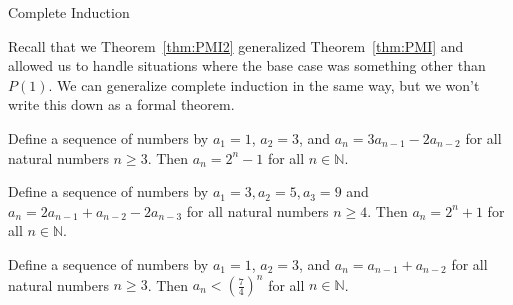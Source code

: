 \begin{section}{Complete Induction}
\begin{skeleton}
\begin{center}
\end{center}
\end{skeleton}

Recall that we Theorem~\ref{thm:PMI2} generalized Theorem~\ref{thm:PMI} and allowed us to handle situations where the base case was something other than $P(1)$.  We can generalize complete induction in the same way, but we won't write this down as a formal theorem.

\begin{theorem}
Define a sequence of numbers by $a_1 = 1$, $a_2 = 3$, and $a_n = 3a_{n-1} - 2a_{n-2}$ for all natural numbers $n \geq 3$.  Then $a_n = 2^n - 1$ for all $n \in \mathbb{N}$.  
\end{theorem}

\begin{theorem}
Define a sequence of numbers by $a_1 = 3, a_2 = 5, a_3 = 9$ and $a_n = 2a_{n-1} + a_{n-2}-2a_{n-3}$ for all natural numbers $n \geq 4$.  Then $a_n = 2^n + 1$ for all $n \in \mathbb{N}$.  
\end{theorem}

\begin{theorem}
Define a sequence of numbers by $a_1=1$, $a_2=3$, and $a_n=a_{n-1}+a_{n-2}$ for all natural numbers $n \geq 3$.  Then $a_n < \left( \frac{7}{4} \right)^n$ for all $n \in \mathbb{N}$.
\end{theorem}


\end{section}
